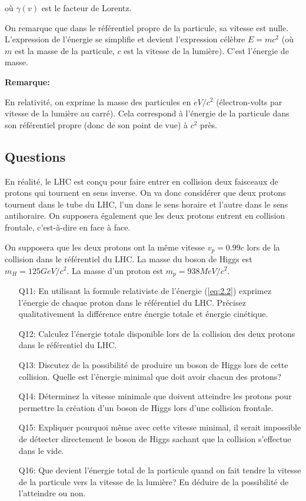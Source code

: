 \documentclass[14pt]{article}
\begin{document}
où $\gamma(v)$ est le facteur de Lorentz.

On remarque que dans le référentiel propre de la particule, sa vitesse est nulle. L'expression de l'énergie se simplifie et devient l'expression célèbre $E = mc^2$ (où $m$ est la masse de la particule, $c$ est la vitesse de la lumière). C'est l'énergie de masse.

\textbf{Remarque:}

En relativité, on exprime la masse des particules en $eV/c^2$ (électron-volts par vitesse de la lumière au carré). Cela correspond à l'énergie de la particule dans son référentiel propre (donc de son point de vue) à $c^2$ près.

\subsection{Questions}

En réalité, le LHC est conçu pour faire entrer en collision deux faisceaux de protons qui tournent en sens inverse. On va donc considérer que deux protons tournent dans le tube du LHC, l'un dans le sens horaire et l'autre dans le sens antihoraire. On supposera également que les deux protons entrent en collision frontale, c'est-à-dire en face à face.

On supposera que les deux protons ont la même vitesse $v_p = 0.99c$ lors de la collision dans le référentiel du LHC. La masse du boson de Higgs est $m_H = 125 GeV / c^2$. La masse d'un proton est $m_p = 938 MeV/c^2$.

\begin{enumerate}
    \item[Q11:] En utilisant la formule relativiste de l'énergie (\ref{eq:2.2}) exprimez l'énergie de chaque proton dans le référentiel du LHC. Précisez qualitativement la différence entre énergie totale et énergie cinétique.
    \item[Q12:] Calculez l'énergie totale disponible lors de la collision des deux protons dans le référentiel du LHC.
    \item[Q13:] Discutez de la possibilité de produire un boson de Higgs lors de cette collision. Quelle est l'énergie minimal que doit avoir chacun des protons?
    \item[Q14:] Déterminez la vitesse minimale que doivent atteindre les protons pour permettre la création d'un boson de Higgs lors d'une collision frontale.
    \item[Q15:] Expliquer pourquoi même avec cette vitesse minimal, il serait impossible de détecter directement le boson de Higgs sachant que la collision s'effectue dans le vide.
    \item[Q16:] Que devient l'énergie total de la particule quand on fait tendre la vitesse de la particule vers la vitesse de la lumière? En déduire de la possibilité de l'atteindre ou non.
\end{enumerate}
\end{document}
